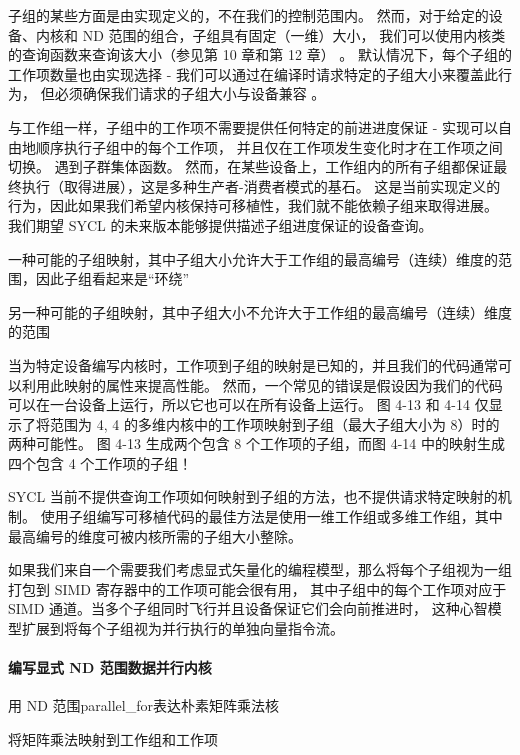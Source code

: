 子组的某些方面是由实现定义的，不在我们的控制范围内。 
然而，对于给定的设备、内核和 ND 范围的组合，子组具有固定（一维）大小，
我们可以使用内核类的查询函数来查询该大小（参见第 10 章和第 12 章） 。 
默认情况下，每个子组的工作项数量也由实现选择 - 我们可以通过在编译时请求特定的子组大小来覆盖此行为，
但必须确保我们请求的子组大小与设备兼容 。

与工作组一样，子组中的工作项不需要提供任何特定的前进进度保证 - 实现可以自由地顺序执行子组中的每个工作项，
并且仅在工作项发生变化时才在工作项之间切换。 遇到子群集体函数。 
然而，在某些设备上，工作组内的所有子组都保证最终执行（取得进展），这是多种生产者-消费者模式的基石。 
这是当前实现定义的行为，因此如果我们希望内核保持可移植性，我们就不能依赖子组来取得进展。 
我们期望 SYCL 的未来版本能够提供描述子组进度保证的设备查询。

{\color{red} 一种可能的子组映射，其中子组大小允许大于工作组的最高编号（连续）维度的范围，因此子组看起来是“环绕”}

{\color{red} 另一种可能的子组映射，其中子组大小不允许大于工作组的最高编号（连续）维度的范围}

当为特定设备编写内核时，工作项到子组的映射是已知的，并且我们的代码通常可以利用此映射的属性来提高性能。 
然而，一个常见的错误是假设因为我们的代码可以在一台设备上运行，所以它也可以在所有设备上运行。 
图 4-13 和 4-14 仅显示了将范围为 {4, 4} 的多维内核中的工作项映射到子组（最大子组大小为 8）时的两种可能性。 
图 4-13 生成两个包含 8 个工作项的子组，而图 4-14 中的映射生成四个包含 4 个工作项的子组！

SYCL 当前不提供查询工作项如何映射到子组的方法，也不提供请求特定映射的机制。 
使用子组编写可移植代码的最佳方法是使用一维工作组或多维工作组，其中最高编号的维度可被内核所需的子组大小整除。

\begin{remark}[在子组中思考]
	如果我们来自一个需要我们考虑显式矢量化的编程模型，那么将每个子组视为一组打包到 SIMD 寄存器中的工作项可能会很有用，
	其中子组中的每个工作项对应于 SIMD 通道。当多个子组同时飞行并且设备保证它们会向前推进时，
	这种心智模型扩展到将每个子组视为并行执行的单独向量指令流。
\end{remark}

\paragraph{编写显式 ND 范围数据并行内核}

{\color{red} 用 ND 范围parallel\_for表达朴素矩阵乘法核 }

{\color{red} 将矩阵乘法映射到工作组和工作项}

